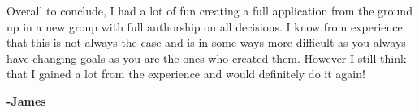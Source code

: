 \documentclass[11pt]{article}
\begin{document}
Overall to conclude, I had a lot of fun creating a full application from the ground up in a new group with full authorship on all decisions. I know from experience that this is not always the case and is in some ways more difficult as you always have changing goals as you are the ones who created them. However I still think that I gained a lot from the experience and would definitely do it again! 

\textbf{-James}
\end{document}
